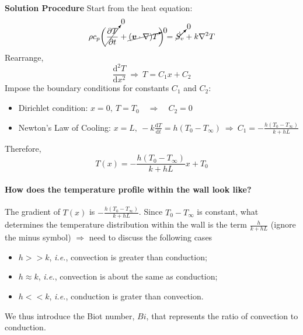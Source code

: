 \documentclass[12pt, a4paper]{article}
\begin{document}
\begin{tcolorbox}[breakable, title = \textbf{Example: Wall Exposed to Convection}]
\textbf{Solution Procedure} \quad
Start from the heat equation:
\[ 
    \rho c_{p}\bigg(\cancelto{0}{\frac{\partial T}{\partial t}} +\cancelto{0}{(\bm{v} \cdot \nabla) T}\bigg) = \cancelto{0}{\dot{S_{v}}}  +k \nabla^{2} T 
\]
Rearrange,
\[ 
    \frac{\mathrm{d}^{2} T}{\mathrm{d} x^{2}} \ \Rightarrow \ T = C_{1}x + C_{2} 
\]
Impose the boundary conditions for constants $C_1$ and $C_2$:
\begin{itemize}
    \item Dirichlet condition: $\displaystyle x=0, \ T = T_{0} \quad \Rightarrow \quad C_{2}=0$
    \item Newton's Law of Cooling: $\displaystyle x=L, \ -k\frac{\mathrm{d}T}{\mathrm{d}t}=h(T_{0}-T_{\infty}) \ \Rightarrow \ C_{1}=-\frac{h(T_{0}-T_{\infty})}{k+hL}$
\end{itemize}
Therefore,
\[ 
    T(x) = -\frac{h(T_{0}-T_{\infty})}{k+hL}x + T_0
\]
\paragraph{How does the temperature profile within the wall look like?} The gradient of $T(x)$ is $\displaystyle -\frac{h(T_{0}-T_{\infty})}{k+hL}$. Since $T_0 - T_\infty$ is constant, what determines the temperature distribution within the wall is the term $\displaystyle \frac{h}{k+hL}$ (ignore the minus symbol) $\Rightarrow$ need to discuss the following cases
\begin{itemize}
    \item $h>>k$, \textit{i.e.}, convection is greater than conduction;
    \item $h \approx k$, \textit{i.e.}, convection is about the same as conduction;
    \item $h<<k$, \textit{i.e.}, conduction is grater than convection.
\end{itemize}
We thus introduce the Biot number, $Bi$, that represents the ratio of convection to conduction.
\end{tcolorbox}
\end{document}
